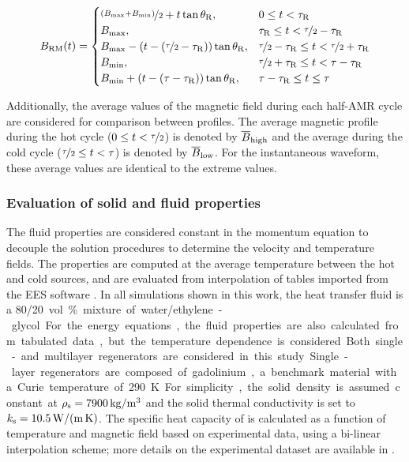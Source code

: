 \documentclass[referee]{svjour3}
\begin{document}
\begin{equation}
{B}_{\mathrm{RM}}(t)=
\begin{cases}
\nicefrac{\left({B}_{\mathrm{max}} + {B}_{\mathrm{min}}\right)}{2} + t \tan \theta_{\mathrm{R}} , & 0 \le t < \tau_{\mathrm{R}} \\
{B}_{\mathrm{max}}, & \tau_{\mathrm{R}} \le t < \nicefrac{\tau}{2} - \tau_{\mathrm{R}}\\
{B}_{\mathrm{max}} - \left(t - \left(\nicefrac{\tau}{2} - \tau_{\mathrm{R}}\right)\right) \tan \theta_{\mathrm{R}} , & \nicefrac{\tau}{2} - \tau_{\mathrm{R}} \le t < \nicefrac{\tau}{2} + \tau_{\mathrm{R}} \\
{B}_{\mathrm{min}}, & \nicefrac{\tau}{2} + \tau_{\mathrm{R}} \le t < \tau - \tau_{\mathrm{R}}\\
{B}_{\mathrm{min}} + \left(t - \left(\tau - \tau_{\mathrm{R}}\right)\right) \tan \theta_{\mathrm{R}} , & \tau - \tau_{\mathrm{R}} \le t \le \tau \\
\end{cases}
\label{eq:203}
\end{equation}


Additionally, the average values of the magnetic field during each half-AMR cycle are considered for comparison between profiles. The average magnetic profile during the hot cycle ($0 \le t < \nicefrac{\tau}{2}$) is denoted by $\overline{B}_{\mathrm{high}}$ and the average during the cold cycle  ($ \nicefrac{\tau}{2} \le t < \tau$) is denoted by $\overline{B}_{\mathrm{low}}$. For the instantaneous waveform, these average values are identical to the extreme values.

\subsubsection{Evaluation of solid and fluid properties}
\label{sec:eval-solid-fluid}

The fluid properties are considered constant in the momentum equation to decouple the solution procedures to determine the velocity and temperature fields. The properties are computed at the average temperature between the hot and cold sources, and are evaluated from interpolation of tables imported from the EES software \cite{bib:klein13-ees}. In all simulations shown in this work, the heat transfer fluid is a \num{80}/\SI{20} vol.\% mixture of water/ethylene-glycol. For the energy equations, the fluid properties are also calculated from tabulated data, but the temperature dependence is considered.


Both single- and multilayer regenerators are considered in this study. Single-layer regenerators are composed of gadolinium,  a benchmark material with a Curie temperature of \SI{290}{\kelvin}. For simplicity, the solid density is assumed constant at $\rho\ped{s} = \SI{7900}{\kg\per\cubic\meter}$ and the solid thermal conductivity is set to $k_{\mathrm{s}} = \SI{10.5}{\watt\per\meter\per\kelvin}$. The specific heat capacity of  is calculated as a function of temperature and magnetic field based on experimental data, using a bi-linear interpolation scheme; more details on the experimental dataset are available in \cite{bib:trevizoli16_perfor_model}. 
\end{document}
